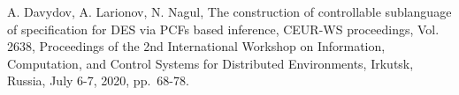 \documentclass[runningheads]{llncs}
\begin{document}
\begin{thebibliography}{999}
       A. Davydov, A. Larionov, N. Nagul, The construction of controllable sublanguage of specification for DES via PCFs based inference, CEUR-WS proceedings, Vol. 2638, Proceedings of the 2nd International Workshop on Information, Computation, and Control Systems for Distributed Environments, Irkutsk, Russia, July 6-7, 2020, pp.~68-78.
      \bibitem{}
      \bibitem{}
      \bibitem{}
      \bibitem{}
      \bibitem{}
      \bibitem{}
      \bibitem{}
      \bibitem{}
      \bibitem{}
      \bibitem{}
      \bibitem{}
      \bibitem{}
\end{thebibliography}
\end{document}
